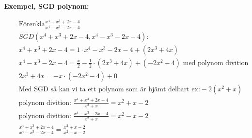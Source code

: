 \documentclass{article}
\begin{document}
\newpage
\textbf{Exempel, SGD polynom:}\par
\begin{align*}
  &\quad  \text{Förenkla} \frac{x^4+x^3+2x-4}{x^4-x^3-2x-4} \\
  &\quad  SGD(x^4+x^3+2x-4, x^4-x^3-2x-4):  \\
  &\quad  x^4+x^3+2x-4 = 1 \cdot x^4-x^3-2x-4 + (2x^3 +4x) \\
  &\quad  x^4-x^3-2x-4 = \frac{x}{2}-\frac{1}{2} \cdot (2x^3 +4x) + (-2x^2-4) \text{ med polynom divition} \\
  &\quad      2x^3 +4x = -x \cdot (-2x^2-4) +0 \\
  &\quad  \text{Med SGD så kan vi ta ett polynom som är hjämt delbart ex:} -2(x^2+x) \\
  &\quad  \text{polynom divition: } \frac{x^4+x^3+2x-4}{x^2+x} = x^2+x-2 \\
  &\quad  \text{polynom divition: } \frac{x^4-x^3-2x-4}{x^2+x} = x^2-x-2 \\
  &\quad  \frac{x^4+x^3+2x-4}{x^4-x^3-2x-4} = \frac{x^2+x-2}{x^2-x-2} \\  
\end{align*}


\newpage
\end{document}
